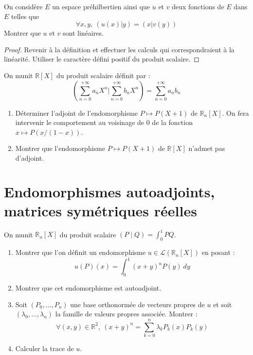 \documentclass[french,a4paper]{article}
\newcommand{\R}{\mathbb{R}}
\theoremstyle{plain}
\theoremstyle{definition}
\theoremstyle{remark}
\begin{document}
\begin{ex}{}
	On considère $E$ un espace préhilbertien ainsi que $u$ et $v$ deux fonctions de $E$ dans $E$ telles que $$\forall x,y,\ (u(x)|y)=(x|v(y))$$ Montrer que $u$ et $v$ sont linéaires.
\end{ex}
\begin{proof}
	Revenir à la définition et effectuer les calculs qui correspondraient à la linéarité. Utiliser le caractère défini positif du produit scalaire.
\end{proof}

\begin{ex}{}
	On munit $\R[X]$ du produit scalaire définit par : $$\left( \sum_{n=0}^{+\infty}a_nX^n \bigg| \sum_{n=0}^{+\infty}b_nX^n\right)=\sum_{n=0}^{+\infty}a_nb_n$$
	\begin{enumerate}
		\item Déterminer l'adjoint de l'endomorphisme $P\mapsto P(X+1)$ de $\R_n[X]$. On fera intervenir le comportement au voisinage de $0$ de la fonction $x\mapsto P(x/(1-x))$.
		\item Montrer que l'endomorphisme $P\mapsto P(X+1)$ de $\R[X]$ n'admet pas d'adjoint.
	\end{enumerate}
\end{ex}

\section{Endomorphismes autoadjoints, matrices symétriques réelles}

\begin{ex}{}
	On munit $\R_n[X]$ du produit scalaire $(P\mid Q)=\displaystyle\int_{0}^{1}PQ$.
	\begin{enumerate}
		\item Montrer que l'on définit un endomorphisme $u\in\mathcal{L}(\R_n[X])$ en posant : $$u(P)(x)=\int_{0}^{1}(x+y)^nP(y)\ dy$$
		\item Montrer que cet endomorphisme est autoadjoint.
		\item Soit $(P_0,\ldots,P_n)$ une base orthonormée de vecteurs propres de $u$ et soit $(\lambda_0,\ldots,\lambda_n)$ la famille de valeurs propres associée. Montrer : $$\forall (x,y)\in\R^2,\ (x+y)^n=\sum_{k=0}^{n}\lambda_kP_k(x)P_k(y)$$
		\item Calculer la trace de $u$.
	\end{enumerate}
\end{ex}
\end{document}
